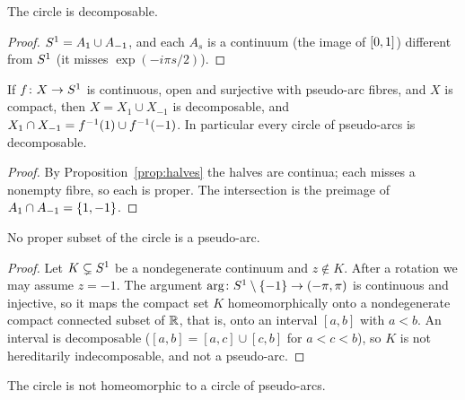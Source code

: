 \begin{proposition}\label{prop:circle-decomp}
The circle is decomposable.
\end{proposition}

\begin{proof}
$S^1=A_1\cup A_{-1}$, and each $A_s$ is a continuum (the image of $[0,1]$) different from $S^1$ (it misses $\exp(-i\pi s/2)$).
\end{proof}


\begin{corollary}\label{cor:circle-pa-decomp}
If $f\colon X\to S^1$ is continuous, open and surjective with pseudo-arc fibres, and $X$ is compact, then $X=X_1\cup X_{-1}$ is decomposable, and
$X_1\cap X_{-1}=f^{-1}(1)\cup f^{-1}(-1)$. In particular every circle of pseudo-arcs is decomposable.
\end{corollary}

\begin{proof}
By Proposition~\ref{prop:halves} the halves are continua; each misses a nonempty fibre, so each is proper. The intersection is the preimage of
$A_1\cap A_{-1}=\left\{ 1,-1 \right\}$.
\end{proof}


\begin{proposition}\label{prop:pa-not-in-circle}
No proper subset of the circle is a pseudo-arc.
\end{proposition}

\begin{proof}
Let $K\subsetneq S^1$ be a nondegenerate continuum and $z\notin K$. After a rotation we may assume $z=-1$. The argument $\arg\colon S^1\setminus\left\{ -1 \right\}\to
(-\pi,\pi)$ is continuous and injective, so it maps the compact set $K$ homeomorphically onto a nondegenerate compact connected subset of $\mathbb{R}$, that is, onto
an interval $[a,b]$ with $a<b$. An interval is decomposable ($[a,b]=[a,c]\cup[c,b]$ for $a<c<b$), so $K$ is not hereditarily indecomposable, and not a
pseudo-arc.
\end{proof}


\begin{corollary}\label{cor:circle-not-cpa}
The circle is not homeomorphic to a circle of pseudo-arcs.
\end{corollary}

